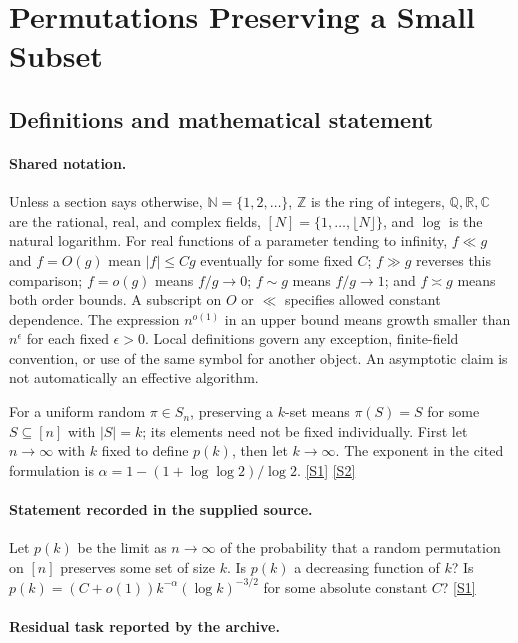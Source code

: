 \documentclass[11pt,a4paper]{article}
\newcommand{\N}{\mathbb{N}}
\newcommand{\Z}{\mathbb{Z}}
\newcommand{\Q}{\mathbb{Q}}
\newcommand{\R}{\mathbb{R}}
\newcommand{\C}{\mathbb{C}}
\newcommand{\sref}[2]{\hyperlink{source:#1:#2}{[S#2]}}
\begin{document}
\section{Permutations Preserving a Small Subset}\label{statement}


\subsection{Definitions and mathematical statement}

\paragraph{Shared notation.}Unless a section says otherwise, $\N=\{1,2,\ldots\}$,
$\Z$ is the ring of integers, $\Q,\R,\C$ are the rational, real, and complex
fields, $[N]=\{1,\ldots,\lfloor N\rfloor\}$, and $\log$ is the natural
logarithm. For real functions of a parameter tending to infinity,
$f\ll g$ and $f=O(g)$ mean $|f|\leq Cg$ eventually for some fixed $C$;
$f\gg g$ reverses this comparison; $f=o(g)$ means $f/g\to0$;
$f\sim g$ means $f/g\to1$; and $f\asymp g$ means both order bounds.
A subscript on $O$ or $\ll$ specifies allowed constant dependence.
The expression $n^{o(1)}$ in an upper bound means growth smaller than
$n^\epsilon$ for each fixed $\epsilon>0$. Local definitions govern any
exception, finite-field convention, or use of the same symbol for another
object. An asymptotic claim is not automatically an effective algorithm.



For a uniform random $\pi\in S_n$, preserving a $k$-set means $\pi(S)=S$ for some $S\subseteq[n]$ with $|S|=k$; its elements need not be fixed individually. First let $n\to\infty$ with $k$ fixed to define $p(k)$, then let $k\to\infty$. The exponent in the cited formulation is $\alpha=1-(1+\log\log2)/\log2$. \sref{statement}{1} \sref{statement}{2}

\paragraph{Statement recorded in the supplied source.}
Let $p(k)$ be the limit as $n \to \infty$ of the probability that a random permutation on $[n]$ preserves some set of size $k$. Is $p(k)$ a decreasing function of $k$? Is $p(k) = (C + o(1))k^{-\alpha}(\log k)^{-3/2}$ for some absolute constant $C$? \sref{statement}{1}

\paragraph{Residual task reported by the archive.}
\end{document}
